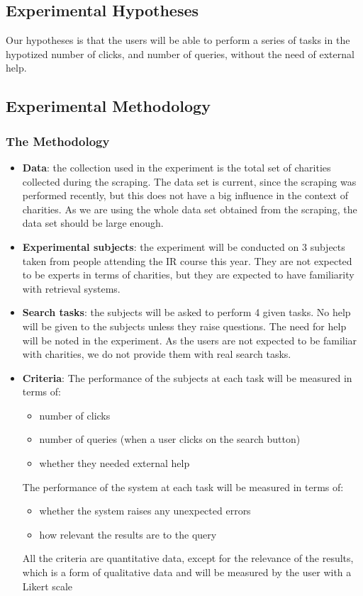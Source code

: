 \documentclass[unicode,9pt,a4paper,oneside,numbers=endperiod,openany]{scrartcl}
\begin{document}
\subsection{Experimental Hypotheses}

Our hypotheses is that the users will be able to perform a series of tasks in the hypotized number of clicks, and number of queries, without the need of external help.

\subsection{Experimental Methodology}

\subsubsection{The Methodology}

\begin{itemize}
    \item \textbf{Data}: the collection used in the experiment is the total set of charities collected during the scraping.
          The data set is current, since the scraping was performed recently, but this does not have a big influence in the context of charities.
          As we are using the whole data set obtained from the scraping, the data set should be large enough.
    \item \textbf{Experimental subjects}: the experiment will be conducted on 3 subjects taken from people attending the IR course this year. They are not expected to be experts in terms of charities, but they are expected to have familiarity with retrieval systems.
    \item \textbf{Search tasks}: the subjects will be asked to perform 4 given tasks. No help will be given to the subjects unless they raise questions. The need for help will be noted in the experiment. As the users are not expected to be familiar with charities, we do not provide them with real search tasks.
    \item \textbf{Criteria}: The performance of the subjects at each task will be measured in terms of:
          \begin{itemize}
              \item number of clicks
              \item number of queries (when a user clicks on the search button)
              \item whether they needed external help
          \end{itemize}
          The performance of the system at each task will be measured in terms of:
          \begin{itemize}
              \item whether the system raises any unexpected errors
              \item how relevant the results are to the query
          \end{itemize}
          All the criteria are quantitative data, except for the relevance of the results, which is a form of qualitative data and will be measured by the user with a Likert scale
\end{itemize}
\end{document}
